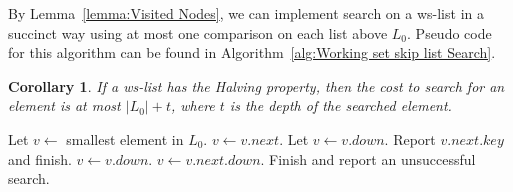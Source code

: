 \documentclass[11pt]{article}       %
\newtheorem{corollary}{Corollary}
\newcommand{\wlist}{ws-list\xspace}
\newcommand{\halving}{Halving property\xspace}
\begin{document}
By Lemma~\ref{lemma:Visited Nodes}, we can implement search on a \wlist in a succinct way using at most one comparison on each list above $L_0$.
Pseudo code for this algorithm can be found in Algorithm~\ref{alg:Working set skip list Search}.

\begin{corollary}\label{corollary:SearchCost}
If a \wlist has the \halving, then the cost to search for an element is at most $|L_0| + t$, where $t$ is the depth of the searched element.
\end{corollary}

\begin{algorithm}
  \begin{algorithmic}[1]
    \STATE Let $v\gets$ smallest element in $L_0$.
    	\STATE $v\gets v.next$.
    \ENDWHILE 
    \STATE Let $v\gets v.down$.
	\label{step:equality}
		\STATE Report $v.next.key$ and finish.
		\STATE $v\gets v.down$.
		\STATE $v\gets v.next.down$.
	\ENDIF
    \ENDWHILE
    \STATE Finish and report an unsuccessful search.
  \end{algorithmic}
\caption{Given an element $x$ of $S$, algorithm to search for $x$ in a \wlist with the \halving.}
\label{alg:Working set skip list Search}
\end{algorithm}
\end{document}
